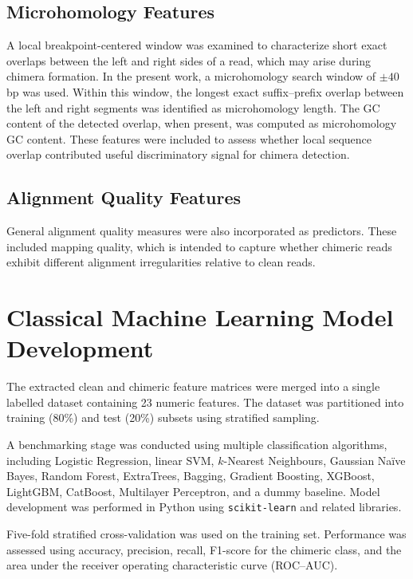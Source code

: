 \subsection{Microhomology Features}

A local breakpoint-centered window was examined to characterize short exact overlaps between the left and right sides of a read, which may arise during chimera formation. In the present work, a microhomology search window of \(\pm 40\) bp was used. Within this window, the longest exact suffix--prefix overlap between the left and right segments was identified as microhomology length. The GC content of the detected overlap, when present, was computed as microhomology GC content. These features were included to assess whether local sequence overlap contributed useful discriminatory signal for chimera detection.

\subsection{Alignment Quality Features}

General alignment quality measures were also incorporated as predictors. These included mapping quality, which is intended to capture whether chimeric reads exhibit different alignment irregularities relative to clean reads.

\section{Classical Machine Learning Model Development}

The extracted clean and chimeric feature matrices were merged into a single labelled dataset containing 23 numeric features. The dataset was partitioned into training (80\%) and test (20\%) subsets using stratified sampling.

A benchmarking stage was conducted using multiple classification algorithms, including Logistic Regression, linear SVM, \(k\)-Nearest Neighbours, Gaussian Na\"ive Bayes, Random Forest, ExtraTrees, Bagging, Gradient Boosting, XGBoost, LightGBM, CatBoost, Multilayer Perceptron, and a dummy baseline. Model development was performed in Python using \texttt{scikit-learn} and related libraries.

Five-fold stratified cross-validation was used on the training set. Performance was assessed using accuracy, precision, recall, F1-score for the chimeric class, and the area under the receiver operating characteristic curve (ROC--AUC).


